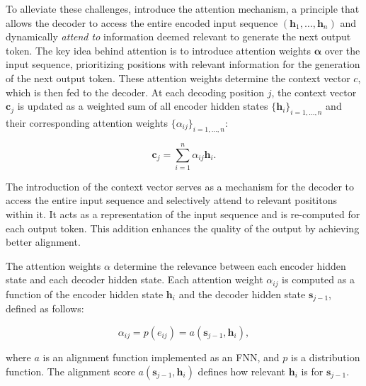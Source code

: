To alleviate these challenges, \citet{bahdanau2014neural} introduce the attention mechanism, a principle that allows the decoder to access the entire encoded input sequence $(\bm{h}_1, \ldots, \bm{h}_n)$ and dynamically \textit{attend to} information deemed relevant to generate the next output token. The key idea behind attention is to introduce attention weights $\bm{\alpha}$ over the input sequence, prioritizing positions with relevant information for the generation of the next output token. These attention weights determine the context vector $c$, which is then fed to the decoder. At each decoding position $j$, the context vector $\bm{c}_j$ is updated as a weighted sum of all encoder hidden states $\{\bm{h}_i\}_{i=1, \ldots, n}$ and their corresponding attention weights $\{\alpha_{ij}\}_{i=1, \ldots, n}$: 

\begin{equation}
    \bm{c}_j = \sum_{i=1}^n \alpha_{ij} \bm{h}_i.
\end{equation}

\noindent The introduction of the context vector serves as a mechanism for the decoder to access the entire input sequence and selectively attend to relevant posititons within it. It acts as a representation of the input sequence and is re-computed for each output token. This addition enhances the quality of the output by achieving better alignment.

The attention weights $\alpha$ determine the relevance between each encoder hidden state and each decoder hidden state. Each attention weight $\alpha_{ij}$ is computed as a function of the encoder hidden state $\bm{h}_i$ and the decoder hidden state $\bm{s}_{j-1}$, defined as follows:

\begin{equation}
    \alpha_{ij} = p(e_{ij}) = a(\bm{s}_{j-1}, \bm{h}_i),
\end{equation}

\noindent where $a$ is an alignment function implemented as an \ac{FNN}, and $p$ is a distribution function. The alignment score $a(\bm{s}_{j-1}, \bm{h}_i)$ defines how relevant $\bm{h}_i$ is for $\bm{s}_{j-1}$.

